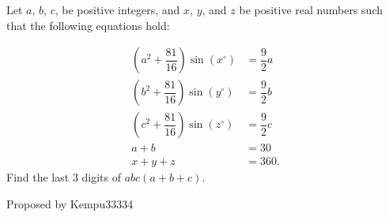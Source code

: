 Let $a$, $b$, $c$, be positive integers, and $x$, $y$, and $z$ be positive real numbers such that the following equations hold:

\begin{align*}
\left(a^2+\dfrac{81}{16}\right)\sin(x^\circ)&=\dfrac{9}{2}a \\
\left(b^2+\dfrac{81}{16}\right)\sin(y^\circ)&=\dfrac{9}{2}b \\
\left(c^2+\dfrac{81}{16}\right)\sin(z^\circ)&=\dfrac{9}{2}c \\
a+b &= 30 \\
x+y+z&=360.
\end{align*}Find the last 3 digits of $abc(a+b+c)$.



 Proposed by Kempu33334
